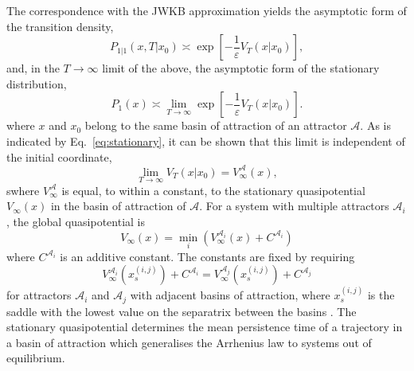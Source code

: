The correspondence with the JWKB approximation yields the asymptotic
form of the transition density,
\begin{equation}
P_{1|1}(x,T|x_{0})\asymp\exp\left[-\frac{1}{\varepsilon}V_{T}(x|x_{0})\right],
\end{equation}
and, in the $T\rightarrow\infty$ limit of the above, the asymptotic
form of the stationary distribution,
\begin{equation}
P_{1}(x)\asymp\lim_{T\to\infty}\exp\left[-\frac{1}{\varepsilon}V_{T}(x|x_{0})\right].\label{eq:stationary}
\end{equation}
where $x$ and $x_{0}$ belong to the same basin of attraction of
an attractor $\mathcal{A}$. As is indicated by Eq.~\ref{eq:stationary},
it can be shown that this limit is independent of
the initial coordinate,
\begin{equation}
\lim_{T\to\infty}V_{T}(x|x_{0})=V_{\infty}^{\mathcal{A}}(x),
\end{equation}
swhere $V_{\infty}^{\mathcal{A}}$ is equal, to within a constant,
to the stationary quasipotential $V_{\infty}(x)$ in the basin of
attraction of $\mathcal{A}$. For a system with multiple attractors
$\mathcal{A}_{i}$, the global quasipotential is
\begin{equation}
V_{\infty}(x)=\min_{i}\left(V_{\infty}^{\mathcal{A}_{i}}(x)+C^{\mathcal{A}_{i}}\right)\label{eq:aggregated quasi-potential}
\end{equation}
where $C^{\mathcal{A}_{i}}$ is an additive constant. The constants
are fixed by requiring
\begin{equation}
V_{\infty}^{\mathcal{A}_{i}}(x_{s}^{(i,j)})+C^{\mathcal{A}_{i}}=V_{\infty}^{\mathcal{A}_{j}}(x_{s}^{(i,j)})+C^{\mathcal{A}_{j}}
\end{equation}
for attractors $\mathcal{A}_{i}$ and $\mathcal{A}_{j}$ with adjacent
basins of attraction, where $x_{s}^{(i,j)}$ is the saddle with the
lowest value on the separatrix between the basins \citep{graham1987macroscopic}.
The stationary quasipotential determines the mean persistence time
of a trajectory in a basin of attraction which generalises the Arrhenius
law to systems out of equilibrium. 

